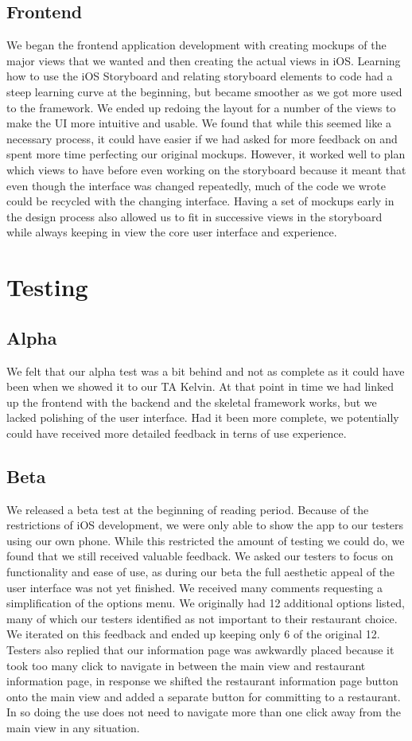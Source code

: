 \documentclass[12pt]{article}
\begin{document}
\subsection{Frontend}
We began the frontend application development with creating mockups of the major views that we wanted and then creating the actual views in iOS. Learning how to use the iOS Storyboard and relating storyboard elements to code had a steep learning curve at the beginning, but became smoother as we got more used to the framework. We ended up redoing the layout for a number of the views to make the UI more intuitive and usable. We found that while this seemed like a necessary process, it could have easier if we had asked for more feedback on and spent more time perfecting our original mockups. However, it worked well to plan which views to have before even working on the storyboard because it meant that even though the interface was changed repeatedly, much of the code we wrote could be recycled with the changing interface. Having a set of mockups early in the design process also allowed us to fit in successive views in the storyboard while always keeping in view the core user interface and experience.

\section{Testing}
\subsection{Alpha}
We felt that our alpha test was a bit behind and not as complete as it could have been when we showed it to our TA Kelvin. At that point in time we had linked up the frontend with the backend and the skeletal framework works, but we lacked polishing of the user interface. Had it been more complete, we potentially could have received more detailed feedback in terns of use experience.

\subsection{Beta}
We released a beta test at the beginning of reading period. Because of the restrictions of iOS development, we were only able to show the app to our testers using our own phone. While this restricted the amount of testing we could do, we found that we still received valuable feedback. We asked our testers to focus on functionality and ease of use, as during our beta the full aesthetic appeal of the user interface was not yet finished. We received many comments requesting a simplification of the options menu. We originally had 12 additional options listed, many of which our testers identified as not important to their restaurant choice. We iterated on this feedback and ended up keeping only 6 of the original 12. Testers also replied that our information page was awkwardly placed because it took too many click to navigate in between the main view and restaurant information page, in response we shifted the restaurant information page button onto the main view and added a separate button for committing to a restaurant. In so doing the use does not need to navigate more than one click away from the main view in any situation.
\end{document}
